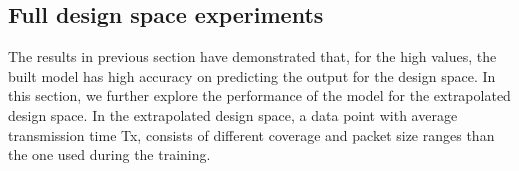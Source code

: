 





\subsection{Full design space experiments}


 
 The results in previous section have demonstrated that, for the high values, the built model has high accuracy on predicting the output for the design space. In this section, we further explore the performance of the model for the extrapolated design space. In the extrapolated design space, a data point with average transmission time Tx, consists of different coverage and packet size ranges than the one used during the training.
 
